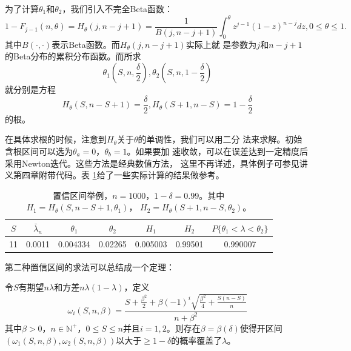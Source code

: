 为了计算$\theta_1$和$\theta_2$，我们引入不完全Beta函数\cite{Abramowitz1970Handbook}：
\begin{equation}
  1 - F_{j - 1}(n, \theta) = H_\theta(j, n - j + 1) = \frac{1}{B(j, n
    - j + 1)}\int_0^\theta z^{j - 1}(1 - z)^{n - j} dz, 0 \leq \theta \leq 1.
  \label{eq::incomplete_beta}
\end{equation}
其中$B(\cdot, \cdot)$表示Beta函数。而$H_\theta(j, n - j + 1)$实际上就
是参数为$j$和$n - j + 1$的Beta分布的累积分布函数。而所求
$$
\theta_1(S, n, \frac{\delta}{2}), \theta_2(S, n, 1 - \frac{\delta}{2})
$$
就分别是方程
$$
H_\theta(S, n - S + 1) = \frac{\delta}{2},
H_\theta(S + 1, n - S) = 1 - \frac{\delta}{2}
$$
的根。

在具体求根的时候，注意到$H_\theta$关于$\theta$的单调性，我们可以用二分
法来求解。初始含根区间可以选为$\theta_a = 0$，$\theta_b = 1$。如果要加
速收敛，可以在误差达到一定精度后采用Newton迭代。这些方法是经典数值方法，
这里不再详述，具体例子可参见讲义第四章附带代码。表
\ref{table::confidence_intervals}给了一些实际计算的结果做参考。

 \begin{table}[!ht]
   \centering
   \caption{置信区间举例，$n = 1000$，$1 - \delta = 0.99$。其中
     $H_1 = H_\theta(S, n - S + 1, \theta_1)$，
     $H_2 = H_\theta(S + 1, n - S, \theta_2)$。}
   \label{table::confidence_intervals}
\begin{tabular}{|c|c|c|c|c|c|c|}
  \hline
  $S$ & $\bar{\lambda}_n$ & $\theta_1$ & $\theta_2$&
  $H_1$&$H_2$&
  $P\{\theta_1 < \lambda < \theta_2\}$\\
  \hline
  11&0.0011&0.004334&0.02265& 0.005003&0.99501&0.990007\\
  \hline
\end{tabular}
\end{table}

第二种置信区间的求法可以总结成一个定理：


\begin{theorem}{}
  令$S$有期望$n \lambda$和方差$n \lambda(1 - \lambda)$，定义
  \begin{equation}
    \omega_i(S, n, \beta) = \frac{S + \frac{\beta^2}{2} +
      \beta(-1)^i\sqrt{\frac{\beta^2}{4} + \frac{S(n - S)}{n}}}{n +
      \beta^2}
    \label{eq::conf_int2}
  \end{equation}
  其中$\beta > 0$，$n \in \mathbb{N}^+$，$0 \leq S \leq n$并且$i = 1,
  2$。则存在$\beta = \beta(\delta)$使得开区间$(\omega_1(S, n, \beta),
  \omega_2(S, n, \beta))$以大于$\geq 1 - \delta$的概率覆盖了$\lambda$。
  \label{thm::conf_int2}
\end{theorem}

